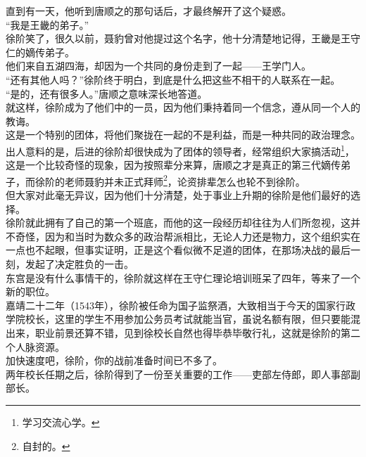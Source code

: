 \begin{multicols}{\theparacolNo}
直到有一天，他听到唐顺之的那句话后，才最终解开了这个疑惑。\\

“我是王畿的弟子。”\\

徐阶笑了，很久以前，聂豹曾对他提过这个名字，他十分清楚地记得，王畿是王守仁的嫡传弟子。\\

他们来自五湖四海，却因为一个共同的身份走到了一起——王学门人。\\

“还有其他人吗？”徐阶终于明白，到底是什么把这些不相干的人联系在一起。\\

“是的，还有很多人。”唐顺之意味深长地答道。\\

就这样，徐阶成为了他们中的一员，因为他们秉持着同一个信念，遵从同一个人的教诲。\\

这是一个特别的团体，将他们聚拢在一起的不是利益，而是一种共同的政治理念。\\

出人意料的是，后进的徐阶却很快成为了团体的领导者，经常组织大家搞活动\footnote{学习交流心学。}，这是一个比较奇怪的现象，因为按照辈分来算，唐顺之才是真正的第三代嫡传弟子，而徐阶的老师聂豹并未正式拜师\footnote{自封的。}，论资排辈怎么也轮不到徐阶。\\

但大家对此毫无异议，因为他们十分清楚，处于事业上升期的徐阶是他们最好的选择。\\

徐阶就此拥有了自己的第一个班底，而他的这一段经历却往往为人们所忽视，这并不奇怪，因为和当时为数众多的政治帮派相比，无论人力还是物力，这个组织实在一点也不起眼，但事实证明，正是这个看似微不足道的团体，在那场决战的最后一刻，发起了决定胜负的一击。\\

东宫是没有什么事情干的，徐阶就这样在王守仁理论培训班呆了四年，等来了一个新的职位。\\

嘉靖二十二年（1543年），徐阶被任命为国子监祭酒，大致相当于今天的国家行政学院校长，这里的学生不用参加公务员考试就能当官，虽说名额有限，但只要能混出来，职业前景还算不错，见到徐校长自然也得毕恭毕敬行礼，这就是徐阶的第二个人脉资源。\\

加快速度吧，徐阶，你的战前准备时间已不多了。\\

两年校长任期之后，徐阶得到了一份至关重要的工作——吏部左侍郎，即人事部副部长。\\


\end{multicols}
